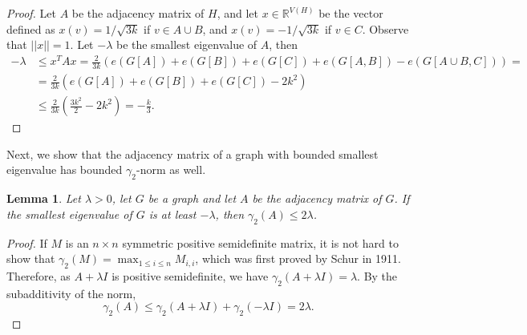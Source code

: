 \documentclass[11pt]{amsart}
\theoremstyle{plain}
\newtheorem{lemma}[theorem]{Lemma}
\theoremstyle{definition}
\begin{document}
\begin{proof}
Let $A$ be the adjacency matrix of $H$, and let $x\in\mathbb{R}^{V(H)}$ be the vector defined as $x(v)=1/\sqrt{3k}$ if $v\in A\cup B$, and $x(v)=-1/\sqrt{3k}$ if $v\in C$. Observe that $||x||=1$. Let $-\lambda$ be the smallest eigenvalue of $A$, then
\begin{align*}
    -\lambda&\leq x^TAx= \frac{2}{3k}(e(G[A])+e(G[B])+e(G[C])+e(G[A,B])-e(G[A\cup B,C]))=\\
    &=\frac{2}{3k}(e(G[A])+e(G[B])+e(G[C])-2k^2)\\
    &\leq \frac{2}{3k}\left(\frac{3k^2}{2}-2k^2\right)=-\frac{k}{3}.
\end{align*}

\end{proof}

Next, we show that the adjacency matrix of a graph with bounded smallest eigenvalue has bounded $\gamma_2$-norm as well.

\begin{lemma}\label{lemma:smallest_eigenvalue}
Let $\lambda>0$, let $G$ be a graph and let $A$ be the adjacency matrix of $G$. If the smallest eigenvalue of $G$ is at least $-\lambda$, then $\gamma_2(A)\leq 2\lambda$.
\end{lemma}

\begin{proof}
If $M$ is an $n \times n$ symmetric positive semidefinite matrix, it is not hard to show that $\gamma_2(M) = \max_{1\leq i\leq n}{M_{i,i}}$, which was first proved by Schur \cite{Sch} in 1911. Therefore, as $A+\lambda I$ is positive semidefinite, we have $\gamma_2(A + \lambda I) = \lambda$. By the subadditivity of the norm, $$\gamma_2(A) \leq \gamma_2(A + \lambda I) + \gamma_2(-\lambda I) = 2 \lambda.$$
\end{proof}
\end{document}
